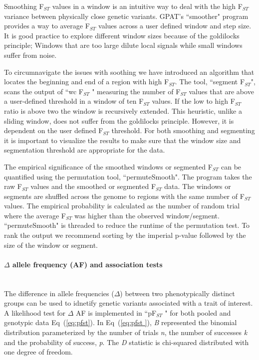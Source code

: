 \documentclass[10pt,letterpaper]{article}
\begin{document}
Smoothing F$_{ST}$  values in a window is an intuitive way to deal with the high F$_{ST}$ variance between physically close genetic variants.  GPAT's ``smoother" program provides a way to average  F$_{ST}$  values across a user defined window and step size.  It is good practice to explore different window sizes because of the goldilocks principle; Windows that are too large dilute local signals while small windows suffer from noise.

To circumnavigate the issues with soothing we have introduced an algorithm that locates the beginning and end of a region with high  F$_{ST}$.  The tool, ``segment F$_{ST}$", scans the output of ``wc F$_{ST}$ " measuring the number of  F$_{ST}$  values that are above a user-defined threshold in a window of ten F$_{ST}$ values.  If the low to high  F$_{ST}$  ratio is above two the window is recursively extended.  This heuristic, unlike a sliding window, does not suffer from the goldilocks principle.  However, it is dependent on the user defined F$_{ST}$ threshold.  For both smoothing and segmenting it is important to visualize the results to make sure that the window size and segmentation threshold are appropriate for the data.

The empirical significance of the smoothed windows or segmented  F$_{ST}$ can be quantified using the permutation tool, ``permuteSmooth".  The program takes the raw F$_{ST}$ values and the smoothed or segmented F$_{ST}$  data.  The windows or segments are shuffled across the genome to regions with the same number of  F$_{ST}$  values.  The empirical probability is calculated as the number of random trial where the average  F$_{ST}$  was higher than the observed window/segment.  ``permuteSmooth" is threaded to reduce the runtime of the permutation test.  To rank the output we recommend sorting by the imperial p-value followed by the size of the window or segment.

\paragraph*{$\Delta$ allele frequency (AF) and association tests} \mbox{} \\

The difference in allele frequencies ($\Delta$) between two phenotypically distinct groups can be used to idnetify genetic variants associated with a trait of interest.  A likelihood test for $\Delta$ AF is implemented in ``pF$_{ST}$ " for both pooled and genotypic data Eq~(\ref{eq:pfst}).   In Eq~(\ref{eq:pfst }), \textit{B} represented the binomial distribution parameterized by the number of trials \textit{n}, the number of successes \textit{k} and the probability of success, \textit{p}.  The \textit{D} statistic is chi-squared distributed with one degree of freedom.
\end{document}
